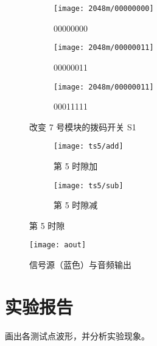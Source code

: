 \documentclass[../main]{subfiles}
\begin{document}
\begin{figure}[htbp]
  \centering
  \begin{subfigure}[htbp]{0.45\linewidth}
    \centering
    \texttt{[image: 2048m/00000000]}
    \caption{00000000}%
    \label{fig:2048m/00000000}
  \end{subfigure}
  \quad
  \begin{subfigure}[htbp]{0.45\linewidth}
    \centering
    \texttt{[image: 2048m/00000011]}
    \caption{00000011}%
    \label{fig:2048m/00000011}
  \end{subfigure}

  \begin{subfigure}[htbp]{0.45\linewidth}
    \centering
    \texttt{[image: 2048m/00000011]}
    \caption{00011111}%
    \label{fig:2048m/00011111}
  \end{subfigure}
  \caption{改变 7 号模块的拨码开关 S1}%
  \label{fig:2048m}
\end{figure}

\begin{figure}[htbp]
  \centering
  \begin{subfigure}[htbp]{0.45\linewidth}
    \centering
    \texttt{[image: ts5/add]}
    \caption{第 5 时隙加}%
    \label{fig:ts5/add}
  \end{subfigure}
  \quad
  \begin{subfigure}[htbp]{0.45\linewidth}
    \centering
    \texttt{[image: ts5/sub]}
    \caption{第 5 时隙减}%
    \label{fig:ts5/sub}
  \end{subfigure}
  \caption{第 5 时隙}%
  \label{fig:ts5}
\end{figure}

\begin{figure}[htbp]
  \centering
  \texttt{[image: aout]}
  \caption{信号源（蓝色）与音频输出}%
  \label{fig:aout}
\end{figure}

\section{实验报告}%
\label{sec:\arabic{chapter}report}

\begin{Exercise}
  画出各测试点波形，并分析实验现象。
\end{Exercise}
\end{document}
